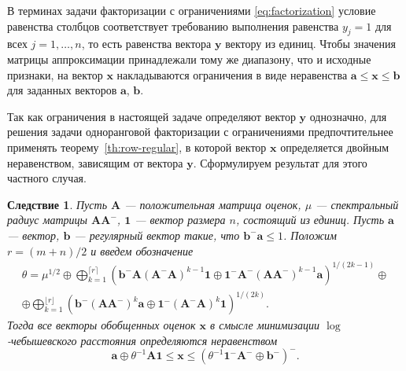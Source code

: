 \documentclass[specialist,
               substylefile = spbu.rtx,
               subf,href,colorlinks=true, 12pt]{disser}
\newtheorem{corollary}{Следствие}
\theoremstyle{definition}
\begin{document}
В терминах задачи факторизации с ограничениями \eqref{eq:factorization} условие равенства столбцов соответствует требованию выполнения равенства $y_{j}=1$ для всех $j=1,\ldots,n$, то есть равенства вектора $\bm{y}$ вектору из единиц. Чтобы значения матрицы аппроксимации принадлежали тому же диапазону, что и исходные признаки, на вектор $\bm{x}$ накладываются ограничения в виде неравенства $\bm{a}\leq\bm{x}\leq\bm{b}$ для заданных векторов $\bm{a}$, $\bm{b}$.


Так как ограничения в настоящей задаче определяют вектор $\bm{y}$ однозначно, для решения задачи одноранговой факторизации с ограничениями предпочтительнее применять теорему~\ref{th:row-regular}, в которой вектор $\bm{x}$ определяется двойным неравенством, зависящим от вектора $\bm{y}$. Сформулируем результат для этого частного случая.
\begin{corollary}
\label{cor:marks}
Пусть $\bm{A}$ --- положительная матрица оценок, $\mu$ --- спектральный радиус матрицы $\bm{A}\bm{A}^{-}$, $\bm{1}$ --- вектор размера $n$, состоящий из единиц. Пусть $\bm{a}$ --- вектор, $\bm{b}$ --- регулярный вектор такие, что $\bm{b}^{-}\bm{a}\leq 1$. Положим $r=(m+n)/2$ и введем обозначение
\begin{multline*}
\theta
=
\mu^{1/2}
\oplus
\bigoplus_{k=1}^{\lceil r\rceil}
\left(
\bm{b}^{-}\bm{A}(\bm{A}^{-}\bm{A})^{k-1}\bm{1}
\oplus
\bm{1}^{-}\bm{A}^{-}(\bm{A}\bm{A}^{-})^{k-1}\bm{a}
\right)^{1/(2k-1)}
\oplus
\\
\oplus
\bigoplus_{k=1}^{\lfloor r\rfloor}
\left(
\bm{b}^{-}(\bm{A}\bm{A}^{-})^{k}\bm{a}
\oplus
\bm{1}^{-}(\bm{A}^{-}\bm{A})^{k}\bm{1}
\right)^{1/(2k)}.
\end{multline*}
Тогда все векторы обобщенных оценок $\bm{x}$ в смысле минимизации $\log$-чебышевского расстояния определяются неравенством  %
\begin{equation*}
\bm{a}
\oplus
\theta^{-1}\bm{A}\bm{1}
\leq
\bm{x}
\leq
(\theta^{-1}\bm{1}^{-}\bm{A}^{-}\oplus\bm{b}^{-})^{-}.
\end{equation*}
\end{corollary}
\end{document}

